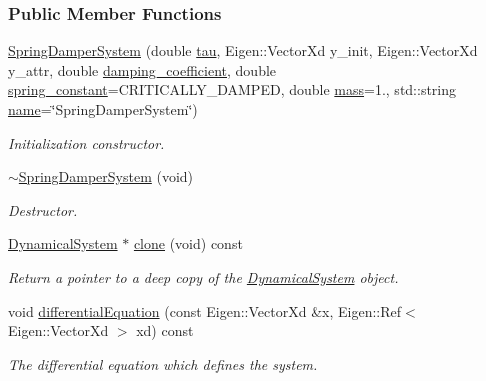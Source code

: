 \subsubsection*{Public Member Functions}
\begin{DoxyCompactItemize}
\item 
\hyperlink{classDmpBbo_1_1SpringDamperSystem_ae89cb23307911c37c2c5bdedd0b9a1c6}{Spring\+Damper\+System} (double \hyperlink{group__DynamicalSystems_ga50eec7ad4c9664b5809ace45b22200d5}{tau}, Eigen\+::\+Vector\+Xd y\+\_\+init, Eigen\+::\+Vector\+Xd y\+\_\+attr, double \hyperlink{classDmpBbo_1_1SpringDamperSystem_a1e0acb1d6298104e74f81f53768f5bf1}{damping\+\_\+coefficient}, double \hyperlink{classDmpBbo_1_1SpringDamperSystem_a4afd1caf44ce68f2747d8fa8a1388b0a}{spring\+\_\+constant}=C\+R\+I\+T\+I\+C\+A\+L\+L\+Y\+\_\+\+D\+A\+M\+P\+E\+D, double \hyperlink{classDmpBbo_1_1SpringDamperSystem_a387fcfdb067c6de3be9bfd61b868b839}{mass}=1., std\+::string \hyperlink{group__DynamicalSystems_gacd23346c798f78014a4f82c853e83c88}{name}=\char`\"{}Spring\+Damper\+System\char`\"{})
\begin{DoxyCompactList}\small\item\em Initialization constructor. \end{DoxyCompactList}\item 
\hyperlink{classDmpBbo_1_1SpringDamperSystem_a5b1ce37e793a6a361bf58f10b2fc22f0}{$\sim$\+Spring\+Damper\+System} (void)
\begin{DoxyCompactList}\small\item\em Destructor. \end{DoxyCompactList}\item 
\hyperlink{classDmpBbo_1_1DynamicalSystem}{Dynamical\+System} $\ast$ \hyperlink{classDmpBbo_1_1SpringDamperSystem_a16b3e8da712b58f8295cbb7951bebf68}{clone} (void) const 
\begin{DoxyCompactList}\small\item\em Return a pointer to a deep copy of the \hyperlink{classDmpBbo_1_1DynamicalSystem}{Dynamical\+System} object. \end{DoxyCompactList}\item 
void \hyperlink{classDmpBbo_1_1SpringDamperSystem_ab564468764e7e4dc7c11e2a786e22c19}{differential\+Equation} (const Eigen\+::\+Vector\+Xd \&x, Eigen\+::\+Ref$<$ Eigen\+::\+Vector\+Xd $>$ xd) const 
\begin{DoxyCompactList}\small\item\em The differential equation which defines the system. \end{DoxyCompactList}\item 

\end{DoxyCompactItemize}
